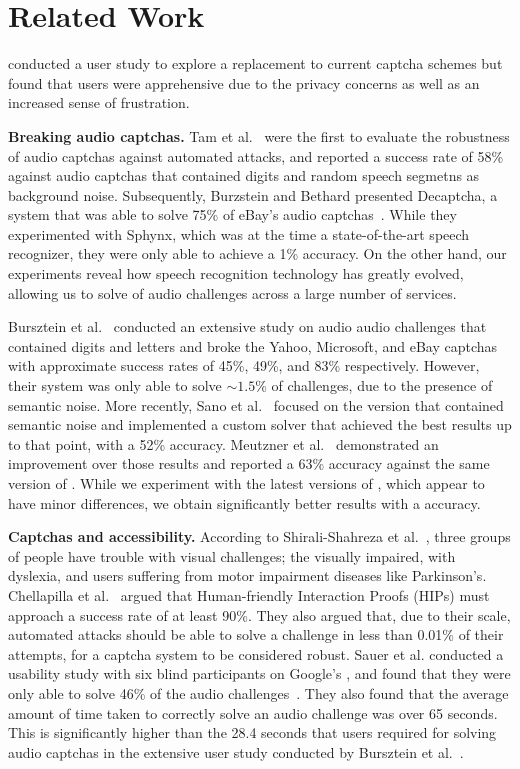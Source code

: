 \section{Related Work}
\label{sec:related}

\cite{krol2016better} conducted a user study to explore a replacement to current captcha schemes
but found that users were apprehensive due to the privacy concerns as well as an increased 
sense of frustration.

\textbf{Breaking audio captchas.} Tam et al.~\cite{tam2008improving} were the 
first to evaluate the robustness of audio captchas against automated attacks,
and reported a success rate of 58\% against audio captchas that contained 
digits and random speech segmetns as background noise. Subsequently, 
Burzstein and Bethard presented Decaptcha, a system that was able to solve 75\%
of eBay's audio captchas~\cite{Bursztein2009}. While they experimented with Sphynx,
which was at the time a state-of-the-art speech recognizer, they were only able to 
achieve a 1\% accuracy. On the other hand, our experiments reveal how speech recognition
technology has greatly evolved, allowing us to solve  of audio challenges
across a large number of services.

Bursztein et al.~\cite{bursztein2011failure} conducted an extensive study on audio audio 
challenges that contained digits and letters and broke the Yahoo, Microsoft, and eBay 
captchas with approximate success rates of 45\%, 49\%, and 83\% respectively. However, 
their system was only able to solve $\sim1.5\%$ of \re challenges, due to the presence 
of semantic noise. More recently, Sano et al.~\cite{Sano2013} focused on the \re
version that contained semantic noise and implemented a custom solver that achieved the best
results up to that point, with a 52\% accuracy. Meutzner et al.~\cite{meutzner2014using} demonstrated 
an improvement over those results and reported a 63\% accuracy against the same version of \re. While
we experiment with the latest versions of \re, which appear to have minor differences, 
we obtain significantly better results with a  accuracy.

\textbf{Captchas and accessibility.} According to Shirali-Shahreza et al.~\cite{shirali2011accessibility},
three groups of people have trouble with visual challenges; the visually impaired,
with dyslexia, and users suffering from motor impairment diseases like Parkinson's.
Chellapilla et al.~\cite{Chellapilla} argued that Human-friendly Interaction Proofs (HIPs)
must approach a success rate of at least 90\%. They also argued that, due to their scale, automated attacks
should be able to solve a challenge in less than 0.01\% of their attempts, for a captcha system to be considered
robust. Sauer et al. conducted a usability study with six blind participants on Google's \re, 
and found that they were only able to solve 46\% of the audio challenges~\cite{sauer2008towards}.
They also found that the average amount of time taken to correctly solve an audio challenge was over 65 seconds.
This is significantly higher than the 28.4 seconds that users required for solving audio captchas
in the extensive user study conducted by Bursztein et al.~\cite{captchas-are-hard}.

